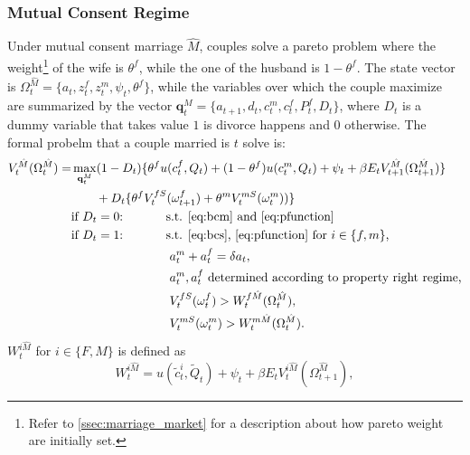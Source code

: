 \documentclass[12pt]{article}
\numberwithin{table}{section}
\begin{document}
\subsubsection*{Mutual Consent Regime}
Under mutual consent marriage $\hat{M}$, couples solve a pareto problem where the weight\footnote{Refer to \autoref{ssec:marriage_market} for a description about how pareto weight are initially set.} of the wife is $\theta^f$, while the one of the husband is $1-\theta^f$. The state vector is $\Omega^{\hat{M}}_t=\{a_t,z^f_t,z^m_t,\psi_t,\theta^f\}$, while the variables over which the couple maximize are summarized by the vector $\mathbf{q}^M_t=\{a_{t+1},d_{t},c^m_{t},c^f_{t},P^f_t,D_t\}$, where $D_t$ is a dummy variable that takes value $1$ is divorce happens and $0$ otherwise. The formal probelm that a couple married is $t$ solve is:
\begin{equation}\label{eq:v_mutual}
\begin{split}
V_t^{\hat{M}}(\Omega^{\hat{M}}_t)=&\max_{\mathbf{q}^M_t} (1-D_t)\{\theta^f u(c^f_t,Q_t)+(1-\theta^f)u(c^m_t,Q_t)+\psi_t+\beta E_t V^{\hat{M}}_{t+1}(\Omega^{\hat{M}}_{t+1})\}\\ &\quad\quad+D_t \{\theta^fV^{fS}_{t}(\omega^{f}_{t+1})+\theta^m  V^{mS}_{t}(\omega^{m}_{t}))\}
\\ &\text{if $D_t=0$:}\hspace{35pt}\text{s.t. \eqref{eq:bcm} and \eqref{eq:pfunction}
}
\\ &\text{if $D_t=1$:}\hspace{35pt}\text{s.t. \eqref{eq:bcs}, \eqref{eq:pfunction} for $i\in\{f,m\}$,}\\ &
\hspace{80pt}a_t^m+a_t^f=\delta a_t,	\\ &
\hspace{80pt}a_t^m,a_t^f\text{ determined according to property right regime,}	\\ &\hspace{80pt}
V_{t}^{fS}(\omega^f_{t})> W^{f\hat{M}}_{t}(\Omega^{\hat{M}}_{t}),\\ &\hspace{80pt}
V_{t}^{mS}(\omega^m_{t})> W^{m\hat{M}}_{t}(\Omega^{\hat{M}}_{t}).
\end{split}
\end{equation}
$W_{t}^{i\hat{M}}$ for $i\in\{F,M\}$ is defined as 
\begin{equation}
W_{t}^{i\hat{M}}=u(\tilde{c}_t^{i},\tilde{Q}_t)+\psi_t+\beta E_t V_{t}^{i\hat{M}}(\Omega^{\hat{M}}_{t+1}),
\end{equation}
\end{document}
